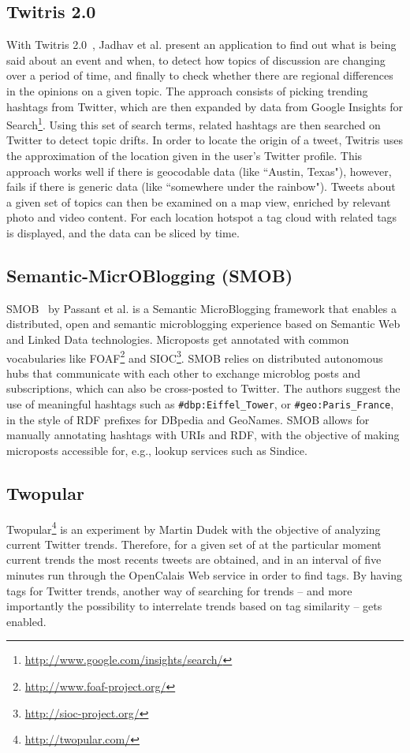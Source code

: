 \documentclass[runningheads,a4paper]{llncs}
\begin{document}
\subsection{Twitris 2.0}
With Twitris 2.0~\cite{Jadhav:Twitris}, Jadhav et al. present an application to find out what is being said about an event and when, to detect how topics of discussion are changing over a period of time, and finally to check whether there are regional differences in the opinions on a given topic. The approach consists of picking trending hashtags from Twitter, which are then expanded by data from Google Insights for Search\footnote{\url{http://www.google.com/insights/search/}}. Using this set of search terms, related hashtags are then searched on Twitter to detect topic drifts. In order to locate the origin of a tweet, Twitris uses the approximation of the location given in the user's Twitter profile. This approach works well if there is geocodable data (like ``Austin, Texas"), however, fails if there is generic data (like ``somewhere under the rainbow"). Tweets about a given set of topics can then be examined on a map view, enriched by relevant photo and video content. For each location hotspot a tag cloud with related tags is displayed, and the data can be sliced by time.

\subsection{Semantic-MicrOBlogging (SMOB)}
SMOB~\cite{Passant2008} by Passant et al. is a Semantic MicroBlogging framework that enables a distributed, open and semantic microblogging experience based on Semantic Web and Linked Data technologies. Microposts get annotated with common vocabularies like FOAF\footnote{\url{http://www.foaf-project.org/}} and SIOC\footnote{\url{http://sioc-project.org/}}. SMOB relies on distributed autonomous hubs that communicate with each other to exchange microblog posts and subscriptions, which can also be cross-posted to Twitter. The authors suggest the use of meaningful hashtags such as \texttt{\#dbp:Eiffel\_Tower}, or \texttt{\#geo:Paris\_France}, in the style of RDF prefixes for DBpedia and GeoNames. SMOB allows for manually annotating hashtags with URIs and RDF, with the objective of making microposts accessible for, e.g., lookup services such as Sindice\cite{Tummarello:Sindice}.

\subsection{Twopular}\label{sec:twopular}
Twopular\footnote{\url{http://twopular.com/}} is an experiment by Martin Dudek with the objective of analyzing current Twitter trends. Therefore, for a given set of at the particular moment current trends the most recents tweets are obtained, and in an interval of five minutes run through the OpenCalais Web service in order to find tags. By having tags for Twitter trends, another way of searching for trends -- and more importantly the possibility to interrelate trends based on tag similarity -- gets enabled.
\end{document}
